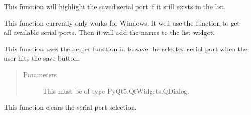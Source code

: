 \documentclass[letterpaper,10pt,english]{sphinxmanual}
\begin{document}
\begin{fulllineitems}
\begin{fulllineitems}
\end{fulllineitems}


\begin{fulllineitems}
\label{\detokenize{portsGUI:portsGUI.Ui_Dialog.highlight_port}}
This function will highlight the saved serial port if it still exists in the list.

\end{fulllineitems}


\begin{fulllineitems}
\label{\detokenize{portsGUI:portsGUI.Ui_Dialog.populate_list}}
This function currently only works for Windows. It well use the 
function to get all available serial ports. Then it will add the names to the list widget.

\end{fulllineitems}


\begin{fulllineitems}
\label{\detokenize{portsGUI:portsGUI.Ui_Dialog.save_list_selection}}
This function uses the helper function in  to save the selected serial port when
the user hits the save button.
\begin{quote}\begin{description}
\item[{Parameters}] \leavevmode
{} \textendash{} This must be of type PyQt5.QtWidgets.QDialog.

\end{description}\end{quote}

\end{fulllineitems}


\begin{fulllineitems}
\label{\detokenize{portsGUI:portsGUI.Ui_Dialog.reset}}
This function clears the serial port selection.

\end{fulllineitems}


\end{fulllineitems}
\end{document}
